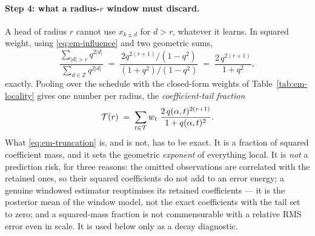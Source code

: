 \paragraph{Step 4: what a radius-$r$ window must discard.} A head of radius $r$
cannot use $x_{k\pm d}$ for $d > r$, whatever it learns. In squared weight,
using \eqref{eq:em-influence} and two geometric sums,
\begin{equation}
  \frac{\sum_{|d| > r} q^{2|d|}}{\sum_{d \in \mathbb{Z}} q^{2|d|}}
  \;=\;
  \frac{2q^{2(r+1)}/(1-q^2)}{(1+q^2)/(1-q^2)}
  \;=\;
  \frac{2\,q^{2(r+1)}}{1+q^2} ,
  \label{eq:em-discarded}
\end{equation}
exactly. Pooling over the schedule with the closed-form weights of
Table~\ref{tab:em-locality} gives one number per radius, the
\emph{coefficient-tail fraction}
\begin{equation}
  \mathcal{T}(r) \;=\; \sum_{t \in \mathcal{T}} w_t \;\frac{2\,q(\alpha,t)^{2(r+1)}}{1 + q(\alpha,t)^2} .
  \label{eq:em-truncation}
\end{equation}
What \eqref{eq:em-truncation} is, and is not, has to be exact.
It is a fraction of squared coefficient mass, and it sets the geometric
\emph{exponent} of everything local. It is \emph{not} a prediction risk, for
three reasons: the omitted observations are correlated with the retained
ones, so their squared coefficients do not add to an error energy; a genuine
windowed estimator reoptimises its retained coefficients --- it is the
posterior mean of the window model, not the exact coefficients with the tail
set to zero; and a squared-mass fraction is not commensurable with a relative
RMS error even in scale. It is used below only as a decay diagnostic.

